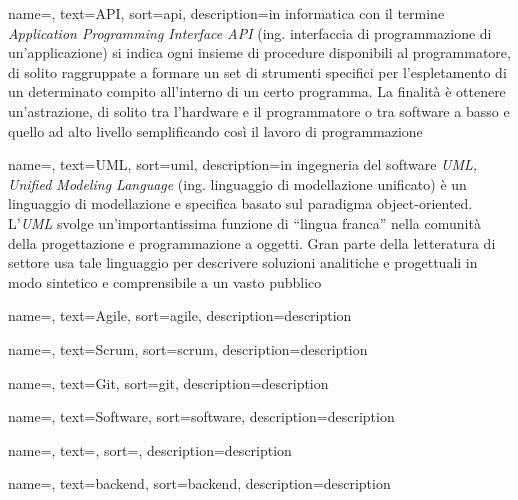

 {
    name=,
    text=API,
    sort=api,
    description={in informatica con il termine \emph{Application Programming Interface API} (ing. interfaccia di programmazione di un'applicazione) si indica
    ogni insieme di procedure disponibili al programmatore, di solito raggruppate a formare un set di strumenti specifici per l'espletamento di un determinato
    compito all'interno di un certo programma. La finalità è ottenere un'astrazione, di solito tra l'hardware e il programmatore o tra software a basso 
    e quello ad alto livello semplificando così il lavoro di programmazione}
}

 {
    name=,
    text=UML,
    sort=uml,
    description={in ingegneria del software \emph{UML, Unified Modeling Language} (ing. linguaggio di modellazione unificato) è un linguaggio di 
    modellazione e specifica basato sul paradigma object-oriented. L'\emph{UML} svolge un'importantissima funzione di ``lingua franca'' nella comunità 
    della progettazione e programmazione a oggetti. Gran parte della letteratura di settore usa tale linguaggio per descrivere soluzioni analitiche e 
    progettuali in modo sintetico e comprensibile a un vasto pubblico}
}

 {
    name=,
    text=Agile,
    sort=agile,
    description={description}
}

 {
    name=,
    text=Scrum,
    sort=scrum,
    description={description}
}

 {
    name=,
    text=Git,
    sort=git,
    description={description}
}

 {
    name=,
    text=Software,
    sort=software,
    description={description}
}

 {
    name=,
    text=,
    sort=,
    description={description}
}

 {
    name=,
    text=backend,
    sort=backend,
    description={description}
}

